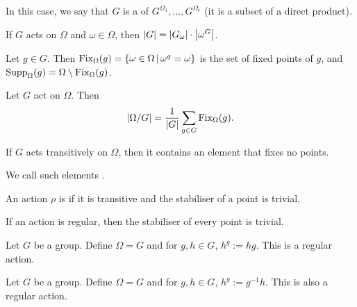 \begin{remark}
  In this case, we say that $G$ is a  of $G^{\Omega_1},
  \ldots, G^{\Omega_r}$ (it is a subset of a direct product).
\end{remark}

\begin{lemma}
  If $G$ acts on $\Omega$ and $\omega \in \Omega$, then $\left| G \right| =
  \left| G_\omega \right| \cdot \left| \omega^G \right|$.
\end{lemma}

\begin{definition}
  Let $g \in G$.
  Then $\operatorname{Fix}_\Omega(g) = \{ \omega \in \Omega \,|\, \omega^g = \omega \}$ is the
  set of fixed points of $g$, and $\operatorname{Supp}_\Omega(g) = \Omega \setminus
  \operatorname{Fix}_\Omega(g)$.
\end{definition}

\begin{lemma}
  Let $G$ act on $\Omega$.
  Then
  \[
	\left| \Omega / G \right| = \frac{1}{\left| G \right|} \sum_{g \in G} \operatorname{Fix}_\Omega(g).
  \]
\end{lemma}

\begin{corollary}
  If $G$ acts transitively on $\Omega$, then it contains an element that fixes
  no points.
\end{corollary}

\begin{remark}
  We call such elements .
\end{remark}

\begin{definition}
  An action $\rho$ is  if it is transitive and the stabiliser of
  a point is trivial.
\end{definition}

\begin{remark}
  If an action is regular, then the stabiliser of every point is trivial.
\end{remark}

\begin{example}
  Let $G$ be a group.
  Define $\Omega = G$ and for $g, h \in G$, $h^g := h g$.
  This is a regular action.
\end{example}

\begin{example}
  Let $G$ be a group.
  Define $\Omega = G$ and for $g, h \in G$, $h^g := g^{-1} h$.
  This is also a regular action.
\end{example}


